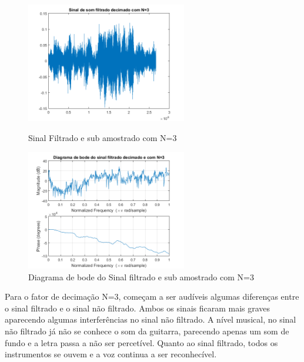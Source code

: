 \documentclass[11pt]{article}
\begin{document}
\newpage
\begin{figure}[h]
\begin{center}
\begin{minipage}[b]{0.45\linewidth}
\includegraphics[width=7cm]{fds3.png}
\caption{Sinal Filtrado e sub amostrado com N=3}
\label{figura11}
\end{minipage}
\begin{minipage}[b]{0.45\linewidth}
\includegraphics[width=7cm]{fdb3.png}
\caption{Diagrama de bode do Sinal filtrado e sub amostrado com N=3}
\label{figura}
\end{minipage}
\end{center}
\end{figure}
Para o fator de decimação N=3, começam a ser audíveis algumas diferenças entre o sinal filtrado e o sinal não filtrado. Ambos os sinais ficaram mais graves aparecendo algumas interferências no sinal não filtrado. A nível musical, no sinal não filtrado já não se conhece o som da guitarra, parecendo apenas um som de fundo e a letra passa a não ser percetível. Quanto ao sinal filtrado, todos os instrumentos se ouvem e a voz continua a ser reconhecível.
\newpage
\end{document}
